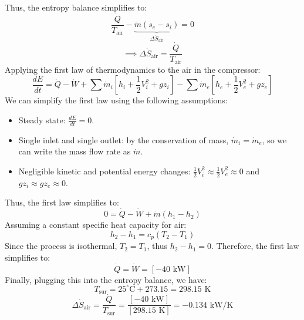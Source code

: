 \documentclass[12pt]{article}
\begin{document}
Thus, the entropy balance simplifies to:
\[\frac{\dot{Q}}{T_\text{air}} - \underbrace{\dot{m}(s_e - s_i)}_{\Delta \dot{S}_\text{air}} = 0\]
\[\implies \Delta \dot{S}_\text{air} = \frac{\dot{Q}}{T_\text{air}}
\]
Applying the first law of thermodynamics to the air in the compressor:
\[\frac{dE}{dt} = \dot{Q} - \dot{W} +\sum \dot{m}_i \left[h_i +\frac{1}{2}V_i^2 + gz_i\right] - \sum \dot{m}_e \left[h_e +\frac{1}{2}V_e^2 + gz_e\right]\]
We can simplify the first law using the following assumptions:
\begin{itemize}
    \item Steady state: $\frac{dE}{dt} = 0$. 
    \item Single inlet and single outlet: by the conservation of mass, $\dot{m}_i = \dot{m}_e$, so we can write the mass flow rate as $\dot{m}$.
    \item Negligible kinetic and potential energy changes: $\frac{1}{2}V_i^2 \approx \frac{1}{2}V_e^2 \approx 0$ and $gz_i \approx gz_e \approx 0$.
\end{itemize}
Thus, the first law simplifies to:
\[0 = \dot{Q} - \dot{W} + \dot{m}(h_1 - h_2)\]
Assuming a constant specific heat capacity for air:
\[h_2 - h_1 = c_p (T_2 - T_1)\]
Since the process is isothermal, $T_2 = T_1$, thus $h_2 - h_1 = 0$. Therefore, the first law simplifies to:
\[\dot{Q} = \dot{W} = [-40 \text{ kW}]\]
Finally, plugging this into the entropy balance, we have:
\[T_\text{sur} = 25^\circ\text{C} + 273.15 = 298.15 \text{ K}\]
\[\Delta \dot{S}_\text{air} = \frac{\dot{Q}}{T_\text{sur}} = \frac{[-40 \text{ kW}]}{[298.15 \text{ K}]} = \boxed{-0.134 \text{ kW/K}}\]


\newpage
\end{document}
